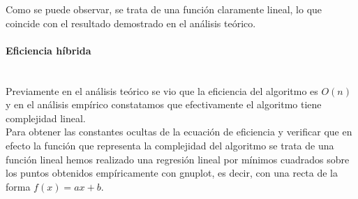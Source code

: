 \documentclass{article}
\newcommand{\myparagraph}[1]{\paragraph{#1}\mbox{}\\}
\begin{document}
Como se puede observar, se trata de una función claramente lineal, lo que coincide con el resultado demostrado en el análisis teórico.

\myparagraph{Eficiencia híbrida}

Previamente en el análisis teórico se vio que la eficiencia del algoritmo es $O(n)$ y en el análisis empírico constatamos que efectivamente el algoritmo tiene complejidad lineal. \\

Para obtener las constantes ocultas de la ecuación de eficiencia y verificar que en efecto la función que representa la complejidad del algoritmo se trata de una función lineal hemos realizado una regresión lineal por mínimos cuadrados sobre los puntos obtenidos empíricamente con gnuplot, es decir, con una recta de la forma $f(x) = ax + b$.\\
\end{document}
